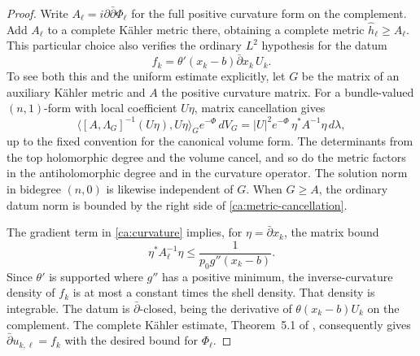 \begin{proof}
Write \(A_\ell=i\partial\bar\partial\Phi_\ell\) for the full
positive curvature form on the complement.  Add \(A_\ell\) to a
complete K\"ahler metric there, obtaining a complete metric
\(\widehat h_\ell\geq A_\ell\).  This particular choice also
verifies the ordinary \(L^2\) hypothesis for the datum
\[
 f_k=\theta'(x_k-b)\bar\partial x_k\,U_k.
\]
To see both this and the uniform estimate explicitly, let
\(G\) be the matrix of an auxiliary K\"ahler metric and \(A\)
the positive curvature matrix.  For a bundle-valued \((n,1)\)-form
with local coefficient \(U\eta\), matrix cancellation gives
\begin{equation}\label{ca:metric-cancellation}
 \bigl\langle[A,\Lambda_G]^{-1}(U\eta),U\eta\bigr\rangle_G
       e^{-\Phi}\,dV_G
 = |U|^2e^{-\Phi}\,\eta^*A^{-1}\eta\,d\lambda,
\end{equation}
up to the fixed convention for the canonical volume form.
The determinants from the top holomorphic degree and the volume
cancel, and so do the metric factors in the antiholomorphic degree
and in the curvature operator.  The solution norm in bidegree
\((n,0)\) is likewise independent of \(G\).  When \(G\geq A\),
the ordinary datum norm is bounded by the right side of
\eqref{ca:metric-cancellation}.

The gradient term in \eqref{ca:curvature} implies, for
\(\eta=\bar\partial x_k\), the matrix bound
\[
 \eta^*A_\ell^{-1}\eta
       \leq\frac{1}{p_0g''(x_k-b)}.
\]
Since \(\theta'\) is supported where \(g''\) has a positive
minimum, the inverse-curvature density of \(f_k\) is at most a
constant times the shell density.  That density is integrable.
The datum is \(\bar\partial\)-closed, being the derivative of
\(\theta(x_k-b)U_k\) on the complement.  The complete K\"ahler
estimate, Theorem~5.1 of \cite{Demailly12}, consequently gives
\(\bar\partial u_{k,\ell}=f_k\) with the desired bound for
\(\Phi_\ell\).


\end{proof}
